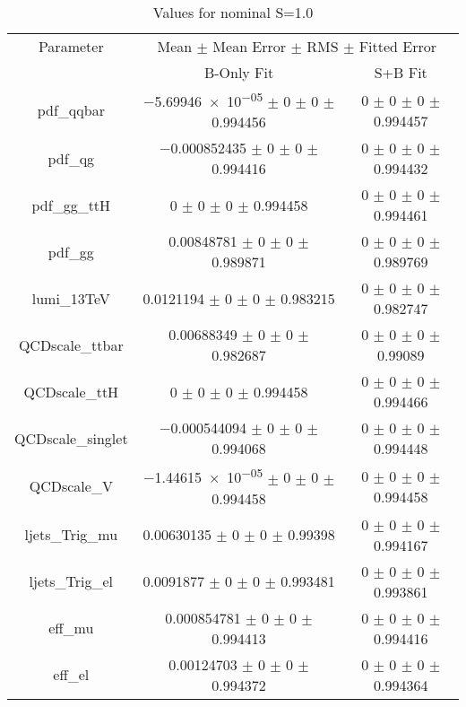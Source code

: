 \begin{table}
\centering
\caption{Values for nominal S=1.0}
\begin{tabular}{ccc}
\toprule
Parameter & \multicolumn{2}{c}{Mean $\pm$ Mean Error $\pm$ RMS $\pm$ Fitted Error}\\
 & B-Only Fit & S+B Fit\\
\midrule
pdf\_qqbar & \num{-5.69946e-05} $\pm$ \num{0} $\pm$ \num{0} $\pm$ \num{0.994456} & \num{0} $\pm$ \num{0} $\pm$ \num{0} $\pm$ \num{0.994457}\\
pdf\_qg & \num{-0.000852435} $\pm$ \num{0} $\pm$ \num{0} $\pm$ \num{0.994416} & \num{0} $\pm$ \num{0} $\pm$ \num{0} $\pm$ \num{0.994432}\\
pdf\_gg\_ttH & \num{0} $\pm$ \num{0} $\pm$ \num{0} $\pm$ \num{0.994458} & \num{0} $\pm$ \num{0} $\pm$ \num{0} $\pm$ \num{0.994461}\\
pdf\_gg & \num{0.00848781} $\pm$ \num{0} $\pm$ \num{0} $\pm$ \num{0.989871} & \num{0} $\pm$ \num{0} $\pm$ \num{0} $\pm$ \num{0.989769}\\
lumi\_13TeV & \num{0.0121194} $\pm$ \num{0} $\pm$ \num{0} $\pm$ \num{0.983215} & \num{0} $\pm$ \num{0} $\pm$ \num{0} $\pm$ \num{0.982747}\\
QCDscale\_ttbar & \num{0.00688349} $\pm$ \num{0} $\pm$ \num{0} $\pm$ \num{0.982687} & \num{0} $\pm$ \num{0} $\pm$ \num{0} $\pm$ \num{0.99089}\\
QCDscale\_ttH & \num{0} $\pm$ \num{0} $\pm$ \num{0} $\pm$ \num{0.994458} & \num{0} $\pm$ \num{0} $\pm$ \num{0} $\pm$ \num{0.994466}\\
QCDscale\_singlet & \num{-0.000544094} $\pm$ \num{0} $\pm$ \num{0} $\pm$ \num{0.994068} & \num{0} $\pm$ \num{0} $\pm$ \num{0} $\pm$ \num{0.994448}\\
QCDscale\_V & \num{-1.44615e-05} $\pm$ \num{0} $\pm$ \num{0} $\pm$ \num{0.994458} & \num{0} $\pm$ \num{0} $\pm$ \num{0} $\pm$ \num{0.994458}\\
ljets\_Trig\_mu & \num{0.00630135} $\pm$ \num{0} $\pm$ \num{0} $\pm$ \num{0.99398} & \num{0} $\pm$ \num{0} $\pm$ \num{0} $\pm$ \num{0.994167}\\
ljets\_Trig\_el & \num{0.0091877} $\pm$ \num{0} $\pm$ \num{0} $\pm$ \num{0.993481} & \num{0} $\pm$ \num{0} $\pm$ \num{0} $\pm$ \num{0.993861}\\
eff\_mu & \num{0.000854781} $\pm$ \num{0} $\pm$ \num{0} $\pm$ \num{0.994413} & \num{0} $\pm$ \num{0} $\pm$ \num{0} $\pm$ \num{0.994416}\\
eff\_el & \num{0.00124703} $\pm$ \num{0} $\pm$ \num{0} $\pm$ \num{0.994372} & \num{0} $\pm$ \num{0} $\pm$ \num{0} $\pm$ \num{0.994364}\\

\end{tabular}
\end{table}
